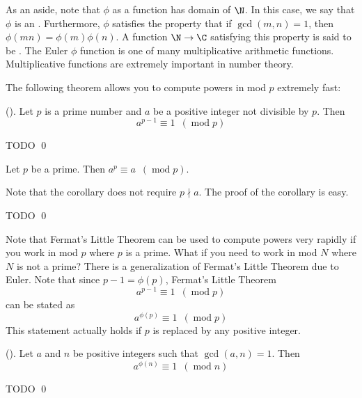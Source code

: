 









As an aside, note that $\phi$ as a function has domain of $\N$.
In this case, we say that $\phi$ is an
.
Furthermore, $\phi$ satisfies the property that
if $\gcd(m,n) = 1$, then $\phi(mn) = \phi(m)\phi(n)$.
A function $\N \rightarrow \C$ satisfying this property
is said to be
.
The Euler $\phi$ function is one of many multiplicative arithmetic
functions.
Multiplicative functions are extremely important in number theory.

The following theorem allows you to compute powers in mod $p$ extremely
fast:

\begin{thm} \textnormal{()}.
  Let $p$ is a prime number
  and $a$ be a positive integer not divisible by $p$. Then
  \[
  a^{p-1} \equiv 1 \,\,\,(\operatorname{mod} p)
  \]
  \end{thm}
\proof
TODO
\qed



\begin{cor}
Let $p$ be a prime. Then $a^p \equiv a
\,\,\,(\operatorname{mod} p)$.
\end{cor}

Note that the corollary does not require $p \nmid a$.
The proof of the corollary is easy.

\proof
TODO
\qed





Note that Fermat's Little Theorem can be used to compute powers
very rapidly if you work in mod $p$ where $p$ is a prime. What if
you need to work in mod $N$ where $N$ is not a prime? There is a
generalization of Fermat's Little Theorem due to Euler. Note that
since $p-1 = \phi(p)$, Fermat's Little Theorem
\[
 a^{p-1} \equiv 1 \,\,\,(\operatorname{mod} p)
\]
can be stated as
\[
 a^{\phi(p)} \equiv 1 \,\,\,(\operatorname{mod} p)
\]
This statement actually holds if $p$ is replaced by any positive
integer.

\begin{thm} \textnormal{()}.
  Let $a$ and $n$ be positive integers such that $\gcd(a, n) = 1$.
  Then
  \[
  a^{\phi(n)} \equiv 1 \,\,\,(\operatorname{mod} n)
  \]
\end{thm}
\proof
TODO
\qed


